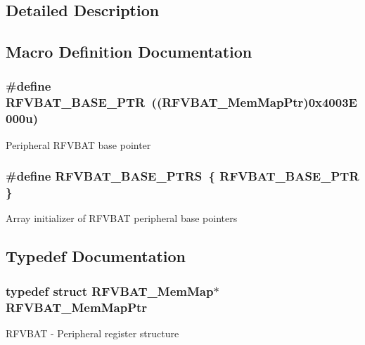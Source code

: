 \subsection{Detailed Description}


\subsection{Macro Definition Documentation}
\hypertarget{group___r_f_v_b_a_t___peripheral_ga5b6418d9be20f84b2190ccf6134b7ba3}{}
\subsubsection[{R\+F\+V\+B\+A\+T\+\_\+\+B\+A\+S\+E\+\_\+\+P\+T\+R}]{\setlength{\rightskip}{0pt plus 5cm}\#define R\+F\+V\+B\+A\+T\+\_\+\+B\+A\+S\+E\+\_\+\+P\+T\+R~(({\bf R\+F\+V\+B\+A\+T\+\_\+\+Mem\+Map\+Ptr})0x4003\+E000u)}\label{group___r_f_v_b_a_t___peripheral_ga5b6418d9be20f84b2190ccf6134b7ba3}
Peripheral R\+F\+V\+B\+A\+T base pointer \hypertarget{group___r_f_v_b_a_t___peripheral_gab0495e22a00c365211c3c8510feca9f2}{}
\subsubsection[{R\+F\+V\+B\+A\+T\+\_\+\+B\+A\+S\+E\+\_\+\+P\+T\+R\+S}]{\setlength{\rightskip}{0pt plus 5cm}\#define R\+F\+V\+B\+A\+T\+\_\+\+B\+A\+S\+E\+\_\+\+P\+T\+R\+S~\{ {\bf R\+F\+V\+B\+A\+T\+\_\+\+B\+A\+S\+E\+\_\+\+P\+T\+R} \}}\label{group___r_f_v_b_a_t___peripheral_gab0495e22a00c365211c3c8510feca9f2}
Array initializer of R\+F\+V\+B\+A\+T peripheral base pointers 

\subsection{Typedef Documentation}
\hypertarget{group___r_f_v_b_a_t___peripheral_gaf818ad4cab94790b0374758504777f4f}{}
\subsubsection[{R\+F\+V\+B\+A\+T\+\_\+\+Mem\+Map\+Ptr}]{\setlength{\rightskip}{0pt plus 5cm}typedef struct {\bf R\+F\+V\+B\+A\+T\+\_\+\+Mem\+Map}$\ast$ {\bf R\+F\+V\+B\+A\+T\+\_\+\+Mem\+Map\+Ptr}}\label{group___r_f_v_b_a_t___peripheral_gaf818ad4cab94790b0374758504777f4f}
R\+F\+V\+B\+A\+T -\/ Peripheral register structure 